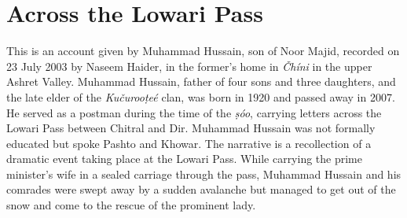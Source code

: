 
\section*{Across the Lowari Pass}

This is an account given by Muhammad Hussain, son of Noor Majid, recorded on 23 July 2003 by Naseem Haider, in the former’s home in \textit{Čhíni} in the upper Ashret Valley. Muhammad Hussain, father of four sons and three daughters, and the late elder of the \textit{Kučurooṭeé} clan, was born in 1920 and passed away in 2007. He served as a postman during the time of the \textit{ṣóo}, carrying letters across the Lowari Pass between Chitral and Dir. Muhammad Hussain was not formally educated but spoke Pashto and Khowar. The narrative is a recollection of a dramatic event taking place at the Lowari Pass. While carrying the prime minister’s wife in a sealed carriage through the pass, Muhammad Hussain and his comrades were swept away by a sudden avalanche but managed to get out of the snow and come to the rescue of the prominent lady.


